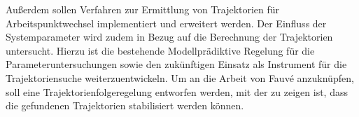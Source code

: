 Außerdem sollen Verfahren zur Ermittlung von Trajektorien für Arbeitspunktwechsel implementiert und erweitert werden.
Der Einfluss der Systemparameter wird zudem in Bezug auf die Berechnung der Trajektorien untersucht. %
Hierzu ist die bestehende Modellprädiktive Regelung für die Parameteruntersuchungen sowie den zukünftigen Einsatz als Instrument für die Trajektoriensuche weiterzuentwickeln. 
Um an die Arbeit von Fauvé \cite{fauve} anzuknüpfen, soll eine Trajektorienfolgeregelung entworfen werden, mit der zu zeigen ist, dass die gefundenen Trajektorien stabilisiert werden können. 

